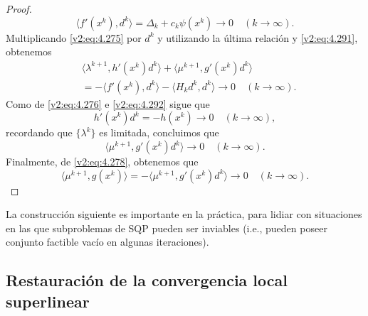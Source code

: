 \begin{proof}
    \[
        \langle f'(x^k), d^k \rangle = \Delta_k + c_k\psi(x^k) \to 0 \quad (k \to \infty).
    \]
    Multiplicando \eqref{v2:eq:4.275} por $d^k$ y utilizando la última relación y \eqref{v2:eq:4.291}, obtenemos
    \begin{align*}
        &\langle \lambda^{k+1}, h'(x^k)d^k \rangle + \langle \mu^{k+1}, g'(x^k)d^k \rangle \\
        &= -\langle f'(x^k), d^k \rangle - \langle H_k d^k, d^k \rangle \to 0 \quad (k \to \infty).
    \end{align*}
    Como de \eqref{v2:eq:4.276} e \eqref{v2:eq:4.292} sigue que
    \[
        h'(x^k)d^k = -h(x^k) \to 0 \quad (k \to \infty),
    \]
    recordando que $\{\lambda^k\}$ es limitada, concluimos que
    \[
        \langle \mu^{k+1}, g'(x^k)d^k \rangle \to 0 \quad (k \to \infty).
    \]
    Finalmente, de \eqref{v2:eq:4.278}, obtenemos que
    \[
        \langle \mu^{k+1}, g(x^k) \rangle = -\langle \mu^{k+1}, g'(x^k)d^k \rangle \to 0 \quad (k \to \infty).
    \]
\end{proof}

La construcción siguiente es importante en la práctica, para lidiar con situaciones en las que subproblemas de SQP pueden ser inviables (i.e., pueden poseer conjunto factible vacío en algunas iteraciones).


\subsection{Restauración de la convergencia local superlinear}\label{v2:sec:4.6.4}

